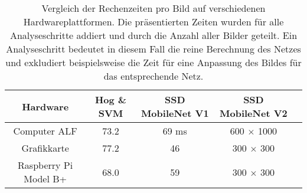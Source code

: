\begin{table}[H]
	\caption{Vergleich der Rechenzeiten pro Bild auf verschiedenen Hardwareplattformen. Die präsentierten Zeiten wurden für alle Analyseschritte addiert und durch die Anzahl aller Bilder geteilt. Ein Analyseschritt bedeutet in diesem Fall die reine Berechnung des Netzes und exkludiert beispielsweise die Zeit für eine Anpassung des Bildes für das entsprechende Netz.  }
	\begin{center}
		\begin{tabular}{|c|c|c|c|c|}
			\hline
			\multicolumn{1}{|c|}{Hardware} & \multicolumn{1}{c|}{Hog \& SVM} & \multicolumn{1}{c|}{SSD MobileNet V1} & \multicolumn{1}{c|}{SSD MobileNet V2} \\ \hline
			Computer ALF	&73.2 	&69 ms		& 600 $\times$ 1000 	 \\
			Grafikkarte			&77.2 	&46		& 	300 $\times$ 300  	 \\
			Raspberry Pi Model B+			&68.0	&59		& 300 $\times$ 300 \\
			
			\hline
		\end{tabular}
	\end{center}

	\label{fig: zeitentab}
\end{table}